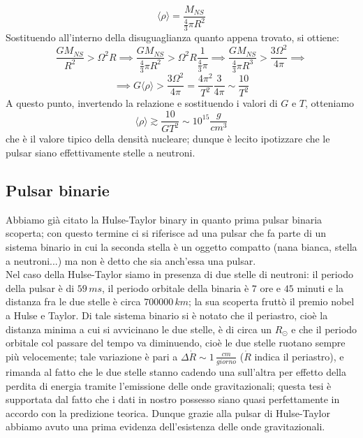 $$\langle \rho \rangle=\frac{M_{NS}}{\frac{4}{3} \pi R^2}$$
Sostituendo all'interno della disuguaglianza quanto appena trovato, si ottiene:
$$\frac{GM_{NS}}{R^2}>\Omega^2 R \implies \frac{GM_{NS}}{\frac{4}{3} \pi R^2}>\Omega^2 R \frac{1}{\frac{4}{3} \pi} \implies \frac{GM_{NS}}{\frac{4}{3} \pi R^3}> \frac{3 \Omega^2}{4 \pi} \implies$$
$$\implies G \langle \rho \rangle > \frac{3 \Omega^2}{4 \pi}= \frac{4 \pi^2}{T^2} \frac{3}{4 \pi} \sim \frac{10}{T^2}$$
A questo punto, invertendo la relazione e sostituendo i valori di $G$ e $T$, otteniamo
$$\langle \rho \rangle \gtrsim \frac{10}{G T^2} \sim 10^ {15} \frac{g}{cm^3}$$
che è il valore tipico della densità nucleare; dunque è lecito ipotizzare che le pulsar siano effettivamente stelle a neutroni.

\subsection{Pulsar binarie}
Abbiamo già citato la Hulse-Taylor binary in quanto prima pulsar binaria scoperta; con questo termine ci si riferisce ad una pulsar che fa parte di un sistema binario in cui la seconda stella è un oggetto compatto (nana bianca, stella a neutroni...) ma non è detto che sia anch'essa una pulsar.\\
Nel caso della Hulse-Taylor siamo in presenza di due stelle di neutroni: il periodo della pulsar è di $59 \, ms$, il periodo orbitale della binaria è $7$ ore e $45$ minuti e la distanza fra le due stelle è circa $700000 \, km$; la sua scoperta fruttò il premio nobel a Hulse e Taylor. Di tale sistema binario si è notato che il periastro, cioè la distanza minima a cui si avvicinano le due stelle, è di circa un $R_{\odot}$ e che il periodo orbitale col passare del tempo va diminuendo, cioè le due stelle ruotano sempre più velocemente; tale variazione è pari a $\Delta \dot{R} \sim 1 \, \frac{cm}{giorno}$ ($\dot{R}$ indica il periastro), e rimanda al fatto che le due stelle stanno cadendo una sull'altra per effetto della perdita di energia tramite l'emissione delle onde gravitazionali; questa tesi è supportata dal fatto che i dati in nostro possesso siano quasi perfettamente in accordo con la predizione teorica. Dunque grazie alla pulsar di Hulse-Taylor abbiamo avuto una prima evidenza dell'esistenza delle onde gravitazionali.

